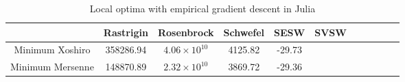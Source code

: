 \documentclass{article}
\begin{document}
            \begin{table}[h]
                \begin{centering}
                    \begin{tabular}{|c|c|c|c|c|c|c|c|c|c|c|}
                        \hline
                                        & Rastrigin & Rosenbrock            & Schwefel & SESW   & SVSW \\
                        \hline
                        \hline
                        Minimum Xoshiro & 358286.94 & $4.06 \times 10^{10}$ & 4125.82  & -29.73 &      \\
                        \hline
                        Minimum Mersenne& 148870.89 & $2.32 \times 10^{10}$ & 3869.72  & -29.36 &      \\
                        \hline
                    \end{tabular}
                    \caption{Local optima with empirical gradient descent in Julia}
            \end{centering}
            \end{table}
$ $ \\ $ $ \\ $ $ \\ $ $ \\ $ $ \\ $ $ \\ $ $ \\ $ $ \\ $ $ \\ $ $ \\ $ $ \\ $ $ \\ $ $ \\ $ $ \\ $ $ \\ $ $ \\ $ $ \\ $ $ \\ $ $ \\ $ $ \\ $ $ \\ $ $ \\ $ $ \\ $ $ \\ 
\pagebreak
\end{document}
